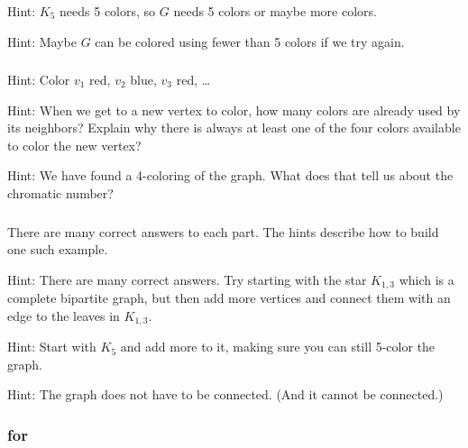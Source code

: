 \subsubsection*{ \answers}
    \begin{apart}
        \item Hint: $K_5$ needs 5 colors, so $G$ needs 5 colors or maybe more colors.
        \item Hint: Maybe $G$ can be colored using fewer than 5 colors if we try again.
    \end{apart}

\subsubsection*{ \answers}
\begin{apart}
    \item Hint: Color $v_1$ red, $v_2$ blue, $v_3$ red, \ldots
    \item Hint: When we get to a new vertex to color, how many colors are already used by its neighbors?  Explain why there is always at least one of the four colors available to color the new vertex?
    \item Hint: We have found a 4-coloring of the graph.  What does that tell us about the chromatic number?
\end{apart}

\subsubsection*{ \answers}
There are many correct answers to each part.  The hints describe how to build one such example.
    \begin{apart}
        \item Hint: There are many correct answers.  Try starting with the star $K_{1,3}$ which is a complete bipartite graph, but then add more vertices and connect them with an edge to the leaves in $K_{1,3}$.
        \item Hint: Start with $K_5$ and add more to it, making sure you can still 5-color the graph.
        \item Hint: The graph does not have to be connected. (And it cannot be connected.)
    \end{apart}

\subsubsection{\answers for  \subgraphconj}

